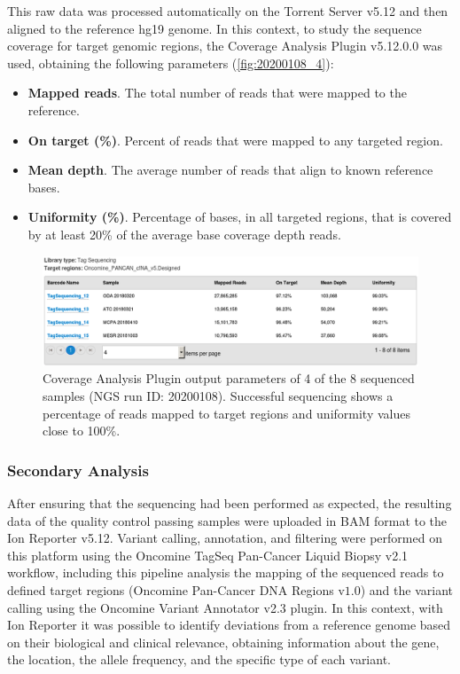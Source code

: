 This raw data was processed automatically on the Torrent Server\texttrademark{} v5.12 and then aligned to the reference hg19 genome. In this context, to study the sequence coverage for target genomic regions, the Coverage Analysis Plugin v5.12.0.0 was used, obtaining the following parameters (\autoref{fig:20200108_4}):
\begin{itemize}
    \item \textbf{Mapped reads}. The total number of reads that were mapped to the reference.
    \item \textbf{On target (\%)}. Percent of reads that were mapped to any targeted region.
    \item \textbf{Mean depth}. The average number of reads that align to known reference bases.
    \item \textbf{Uniformity (\%)}. Percentage of bases, in all targeted regions, that is covered by at least 20\% of the average base coverage depth reads.
\end{itemize}

\begin{figure}[ht]
    \centering
    \includegraphics[width=\textwidth]{Images/chapter_3/20200108/20200108_4_v2.png}
    \caption{Coverage Analysis Plugin output parameters of 4 of the 8 sequenced samples (NGS run ID: 20200108). Successful sequencing shows a percentage of reads mapped to target regions and uniformity values close to 100\%.}
    \label{fig:20200108_4}
\end{figure}

\subsubsection{Secondary Analysis} \label{Secondary_analysis}

After ensuring that the sequencing had been performed as expected, the resulting data of the quality control passing samples were uploaded in BAM format to the Ion Reporter\texttrademark{} v5.12. Variant calling, annotation, and filtering were performed on this platform using the Oncomine\texttrademark{} TagSeq Pan-Cancer Liquid Biopsy v2.1 workflow, including this pipeline analysis the mapping of the sequenced reads to defined target regions (Oncomine\texttrademark{} Pan-Cancer DNA Regions v$1.0$) and the variant calling using the Oncomine\texttrademark{} Variant Annotator v2.3 plugin. In this context, with Ion Reporter\texttrademark{} it was possible to identify deviations from a reference genome based on their biological and clinical relevance, obtaining information about the gene, the location, the allele frequency, and the specific type of each variant.

